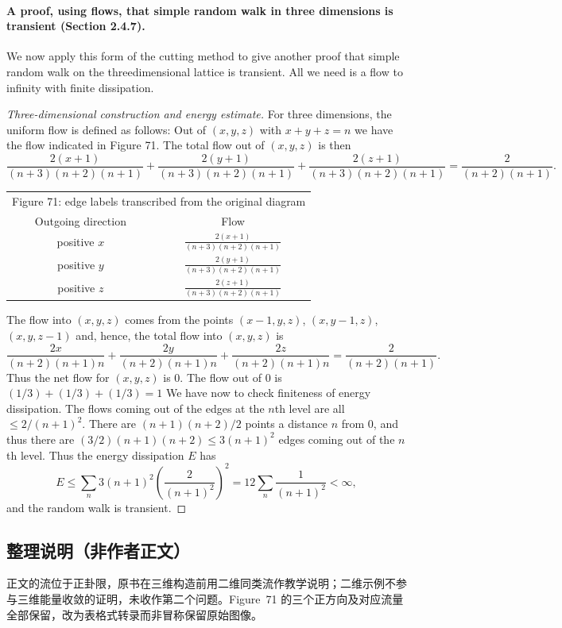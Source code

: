 \documentclass[UTF8,11pt]{ctexart}
\theoremstyle{definition}
\begin{document}
\paragraph{A proof, using flows, that simple random walk in three dimensions is transient (Section 2.4.7).}
We now apply this form of the cutting method to give another proof that simple random walk on the threedimensional lattice is transient. All we need is a flow to infinity with finite dissipation.
\begin{proof}[Three-dimensional construction and energy estimate]
For three dimensions, the uniform flow is defined as follows: Out of $(x,y,z)$ with $x+y+z=n$ we have the flow indicated in Figure 71. The total flow out of $(x,y,z)$ is then
\[
\frac{2(x+1)}{(n+3)(n+2)(n+1)}+
\frac{2(y+1)}{(n+3)(n+2)(n+1)}+
\frac{2(z+1)}{(n+3)(n+2)(n+1)}
=\frac2{(n+2)(n+1)}.
\]
\begin{center}
\begin{tabular}{c|c}
\multicolumn{2}{c}{Figure 71: edge labels transcribed from the original diagram}\\
Outgoing direction & Flow \\\hline
positive $x$ & $\displaystyle\frac{2(x+1)}{(n+3)(n+2)(n+1)}$\\[7pt]
positive $y$ & $\displaystyle\frac{2(y+1)}{(n+3)(n+2)(n+1)}$\\[7pt]
positive $z$ & $\displaystyle\frac{2(z+1)}{(n+3)(n+2)(n+1)}$
\end{tabular}
\end{center}
The flow into $(x,y,z)$ comes from the points $(x-1,y,z)$, $(x,y-1,z)$, $(x,y,z-1)$ and, hence, the total flow into $(x,y,z)$ is
\[
\frac{2x}{(n+2)(n+1)n}+
\frac{2y}{(n+2)(n+1)n}+
\frac{2z}{(n+2)(n+1)n}
=\frac2{(n+2)(n+1)}.
\]
Thus the net flow for $(x,y,z)$ is $0$. The flow out of $0$ is $(1/3)+(1/3)+(1/3)=1$ We have now to check finiteness of energy dissipation. The flows coming out of the edges at the $n$th level are all $\le2/(n+1)^2$. There are $(n+1)(n+2)/2$ points a distance $n$ from $0$, and thus there are $(3/2)(n+1)(n+2)\le3(n+1)^2$ edges coming out of the $n$th level. Thus the energy dissipation $E$ has
\[
E\le\sum_n3(n+1)^2\left(\frac2{(n+1)^2}\right)^2
=12\sum_n\frac1{(n+1)^2}<\infty,
\]
and the random walk is transient.
\end{proof}
\subsection*{整理说明（非作者正文）}
正文的流位于正卦限，原书在三维构造前用二维同类流作教学说明；二维示例不参与三维能量收敛的证明，未收作第二个问题。Figure~71 的三个正方向及对应流量全部保留，改为表格式转录而非冒称保留原始图像。
\end{document}
